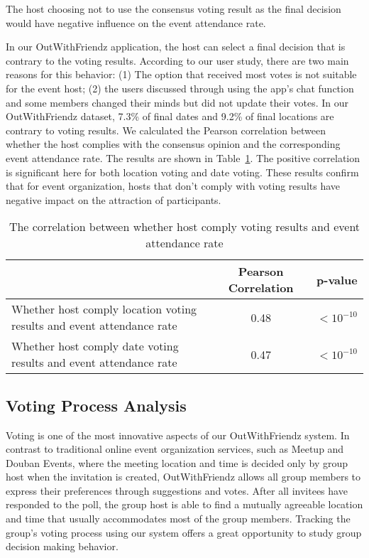 \begin{observation}
The host choosing not to use the consensus voting result as the final decision
would have negative influence on the event attendance rate.
\end{observation}

In our OutWithFriendz application, the host can select a final decision that is
contrary to the voting results. According to our user study, there are
two main reasons for this behavior: (1) The option that received most votes is
not suitable for the event host; (2) the users discussed through using the app's
chat function and some members changed their minds but did not update their
votes. In our OutWithFriendz dataset, 7.3\% of final dates and 9.2\% of final
locations are contrary to voting results.
We calculated the Pearson correlation between whether the host complies with the
consensus opinion and the corresponding event attendance rate. The results are
shown in Table~\ref{tab:comply}. The positive correlation is significant here for both
location voting and date voting. These results confirm that for event
organization, hosts that don't comply with voting results have negative
impact on the attraction of participants.

\begin{table}[]
\centering
\caption{The correlation between whether host comply voting results and event attendance rate}
\label{tab:comply}
\begin{tabular}{|l|c|c|}
\hline
                                                                      & Pearson Correlation & p-value  \\ \hline
Whether host comply location voting results and event attendance rate & 0.48                & $<10^{-10}$ \\ \hline
Whether host comply date voting results and event attendance rate     & 0.47                & $<10^{-10}$ \\ \hline
\end{tabular}
\end{table}

\subsection{Voting Process Analysis}
\label{sec:voting-process}
Voting is one of the most innovative aspects of our OutWithFriendz system.
In contrast to traditional online event organization services, such as
Meetup and Douban Events, where the meeting location and time is decided only by
group host when the invitation is created, OutWithFriendz allows all group
members to express their preferences through suggestions and votes.
After all invitees have responded to the poll, the group host is able to find a
mutually agreeable location and time that usually accommodates most of the group
members.  Tracking the group's voting process using our system offers a great
opportunity to study group decision making behavior.

